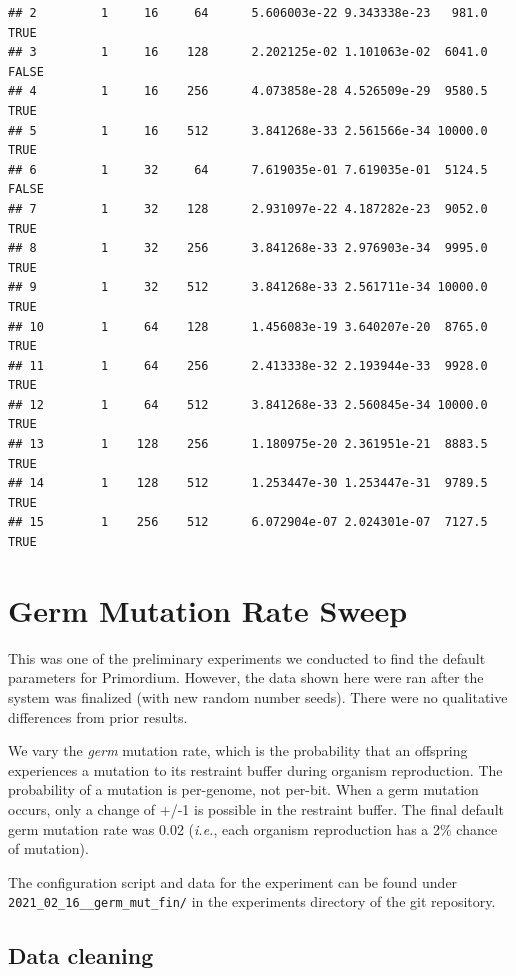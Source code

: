 \documentclass[
]{book}
\begin{document}
\begin{verbatim}
## 2         1     16     64      5.606003e-22 9.343338e-23   981.0      TRUE
## 3         1     16    128      2.202125e-02 1.101063e-02  6041.0     FALSE
## 4         1     16    256      4.073858e-28 4.526509e-29  9580.5      TRUE
## 5         1     16    512      3.841268e-33 2.561566e-34 10000.0      TRUE
## 6         1     32     64      7.619035e-01 7.619035e-01  5124.5     FALSE
## 7         1     32    128      2.931097e-22 4.187282e-23  9052.0      TRUE
## 8         1     32    256      3.841268e-33 2.976903e-34  9995.0      TRUE
## 9         1     32    512      3.841268e-33 2.561711e-34 10000.0      TRUE
## 10        1     64    128      1.456083e-19 3.640207e-20  8765.0      TRUE
## 11        1     64    256      2.413338e-32 2.193944e-33  9928.0      TRUE
## 12        1     64    512      3.841268e-33 2.560845e-34 10000.0      TRUE
## 13        1    128    256      1.180975e-20 2.361951e-21  8883.5      TRUE
## 14        1    128    512      1.253447e-30 1.253447e-31  9789.5      TRUE
## 15        1    256    512      6.072904e-07 2.024301e-07  7127.5      TRUE
\end{verbatim}

\hypertarget{germ-mutation-rate-sweep}{%
\chapter{Germ Mutation Rate Sweep}\label{germ-mutation-rate-sweep}}

This was one of the preliminary experiments we conducted to find the default parameters for Primordium.
However, the data shown here were ran after the system was finalized (with new random number seeds).
There were no qualitative differences from prior results.

We vary the \emph{germ} mutation rate, which is the probability that an offspring experiences a mutation to its restraint buffer during organism reproduction.
The probability of a mutation is per-genome, not per-bit.
When a germ mutation occurs, only a change of +/-1 is possible in the restraint buffer.
The final default germ mutation rate was 0.02 (\emph{i.e.}, each organism reproduction has a 2\% chance of mutation).

The configuration script and data for the experiment can be found under \texttt{2021\_02\_16\_\_germ\_mut\_fin/} in the experiments directory of the git repository.

\hypertarget{data-cleaning-2}{%
\section{Data cleaning}\label{data-cleaning-2}}
\end{document}
